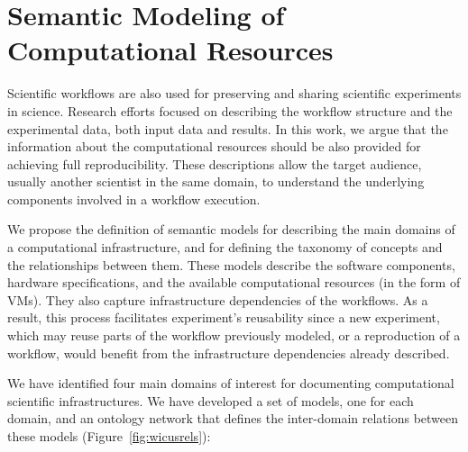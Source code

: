 \section{Semantic Modeling of Computational Resources}
\label{sec:semantic}

Scientific workflows are also used for preserving and sharing scientific experiments in science. Research efforts focused on describing the workflow structure and the experimental data, both input data and results.
In this work, we argue that the information about the computational resources should be also provided for achieving full reproducibility. 
These descriptions  allow the target audience, usually another scientist in the same domain, to understand the underlying components involved in a workflow execution.

We propose the definition of semantic models for describing the main domains of a computational infrastructure, and for defining the taxonomy of concepts and the relationships between them. These models describe the software components, hardware specifications, and the available computational resources (in the form of VMs). They also capture infrastructure dependencies of the workflows. As a result, this process facilitates experiment's reusability since a new experiment, which may reuse parts of the workflow previously modeled, or a reproduction of a workflow, would benefit from the infrastructure dependencies already described.

We have identified four main domains of interest for documenting computational scientific infrastructures. We have developed a set of models, one for each domain, and an ontology network that defines the inter-domain relations between these models (Figure~\ref{fig:wicusrels}):

